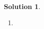 \documentclass[10pt,letterpaper]{article}
\newcommand{\cR}{} %
\newcommand{\dif}[1][]{\mathrm{d} {#1}\,}
\newcommand{\rb}[1]{ \left(  {#1} \right) }
\newcommand{\sqb}[1]{ \left(  {#1} \right) }
\theoremstyle{break}
\newtheorem{mysolution}{Solution}
\newenvironment{solution}{\begin{mysolution}}{\end{mysolution}}
\begin{document}



\begin{solution}
	\begin{enumerate}
	\item

\end{enumerate}
\end{solution}
\end{document}
